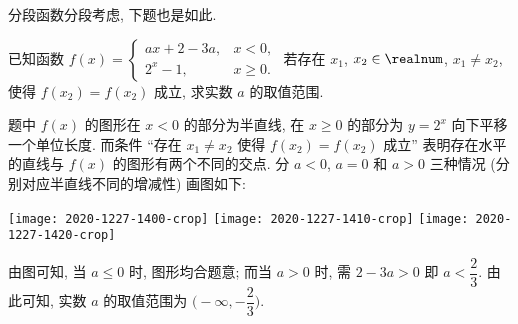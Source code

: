 分段函数分段考虑, 下题也是如此.

\begin{example}
    已知函数 $f(x)= \begin{cases}
        ax+2-3a, & x<0,\\
        2^x-1, & x\geqslant 0.
    \end{cases}$ 若存在 $x_1$, $x_2\in\realnum$, $x_1\neq x_2$, 使得 $f(x_2)= f(x_2)$ 成立, 求实数 $a$ 的取值范围.
\end{example}
\begin{solution}
    题中 $f(x)$ 的图形在 $x<0$ 的部分为半直线, 在 $x\geqslant 0$ 的部分为 $y=2^x$ 向下平移一个单位长度. 而条件 ``存在 $x_1\neq x_2$ 使得 $f(x_2)= f(x_2)$ 成立'' 表明存在水平的直线与 $f(x)$ 的图形有两个不同的交点. 分 $a<0$, $a=0$ 和 $a>0$ 三种情况 (分别对应半直线不同的增减性) 画图如下:
    
    \begin{center}
        \texttt{[image: 2020-1227-1400-crop]}\qquad
        \texttt{[image: 2020-1227-1410-crop]}\qquad
        \texttt{[image: 2020-1227-1420-crop]}
    \end{center}
    
    由图可知, 当 $a\leqslant 0$ 时, 图形均合题意; 而当 $a>0$ 时, 需 $2-3a>0$ 即 $a<\dfrac23$. 由此可知, 实数 $a$ 的取值范围为 $\biggl(-\infty,-\dfrac23\biggr)$.
\end{solution}